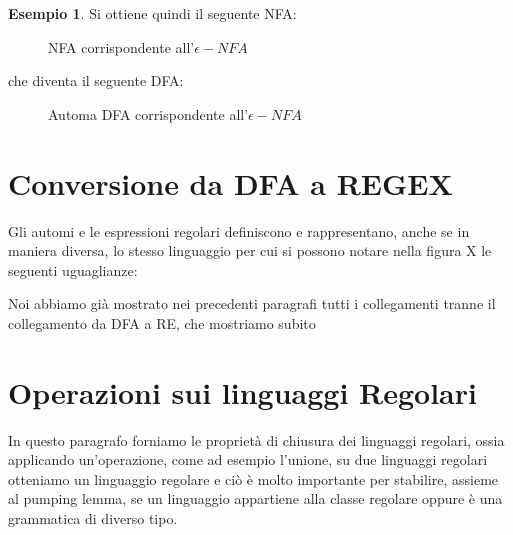 \documentclass[a4paper]{book}
\theoremstyle{definition}%
\newtheorem*{esempio}{Esempio}
\begin{document}
\begin{esempio}
Si ottiene quindi il seguente NFA:
\begin{figure}
\caption{NFA corrispondente all'$\epsilon-NFA$}
\end{figure}
che diventa il seguente DFA:
\begin{figure}
\caption{Automa DFA corrispondente all'$\epsilon-NFA$}
\end{figure}
\end{esempio}

\section{Conversione da DFA a REGEX}
Gli automi e le espressioni regolari definiscono e rappresentano, anche se in maniera diversa, lo stesso linguaggio
per cui si possono notare nella figura X le seguenti uguaglianze:

Noi abbiamo già mostrato nei precedenti paragrafi tutti i collegamenti tranne il collegamento da DFA a RE, che mostriamo subito


\section{Operazioni sui linguaggi Regolari}
In questo paragrafo forniamo le proprietà di chiusura dei linguaggi regolari, ossia applicando un'operazione, come ad esempio l'unione,
su due linguaggi regolari otteniamo un linguaggio regolare e ciò è molto importante per stabilire, assieme al pumping lemma, se un linguaggio
appartiene alla classe regolare oppure è una grammatica di diverso tipo.
\end{document}
